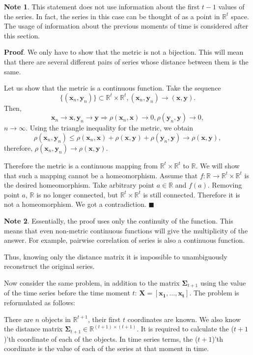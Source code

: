 \documentclass{article}
\begin{document}
\textbf{Note 1}. This statement does not use information about the first $t-1$ values of the series. In fact, the series in this case can be thought of as a point in $\mathbb{R}^t$ space. The usage of information about the previous moments of time is considered after this section.

\textbf{Proof}. We only have to show that the metric is not a bijection. This will mean that there are several different pairs of series whose distance between them is the same.

Let us show that the metric is a continuous function. Take the sequence \[\{(\mathbf{x}_n, \mathbf{y}_n)\} \subset \mathbb{R}^t \times \mathbb{R}^t, (\mathbf{x}_n, \mathbf{y}_n) \to (\mathbf{x}, \mathbf{y}).\] Then, \[\mathbf{x}_n\to \mathbf{x}, \mathbf{y}_n\to \mathbf{y} \Rightarrow \rho(\mathbf{x}_n,\mathbf{x})\to 0 ,\rho(\mathbf{y}_n,\mathbf{y})\to 0,\] $n \to \infty.$ Using the triangle inequality for the metric, we obtain \[\rho(\mathbf{x}_n,\mathbf{y}_n)\leqslant \rho(\mathbf{x}_n,\mathbf{x})+\rho(\mathbf{x},\mathbf{y})+\rho(\mathbf{y}_n,\mathbf{y})\to \rho(\mathbf{x},\mathbf{y}),\] therefore, $\rho(\mathbf{x}_n,\mathbf{y}_n)\to \rho(\mathbf{x},\mathbf{y})$.

Therefore the metric is a continuous mapping from $\mathbb{R}^t \times \mathbb{R}^t$ to $\mathbb{R}$. We will show that such a mapping cannot be a homeomorphism. Assume that $f: \mathbb{R} \to \mathbb{R}^t \times \mathbb{R}^t$ is the desired homeomorphism. Take arbitrary point $a \in \mathbb{R}$ and $f(a)$. Removing point $a$, $\mathbb{R}$ is no longer connected, but $\mathbb{R}^t \times \mathbb{R}^t$ is still connected. Therefore it is not a homeomorphism. We got a contradiction.
$\blacksquare$

\textbf{Note 2}. Essentially, the proof uses only the continuity of the function. This means that even non-metric continuous functions will give the multiplicity of the answer. For example, pairwise correlation of series is also a continuous function.

Thus, knowing only the distance matrix it is impossible to unambiguously reconstruct the original series.

Now consider the same problem, in addition to the matrix $\mathbf{\Sigma}_{t+1}$ using the value of the time series before the time moment $t$: $\mathbf{X}=[\mathbf{x_1}, \ldots, \mathbf{x_{t}}]$. The problem is reformulated as follows:

There are $n$ objects in $\mathbb{R}^{t+1}$, their first $t$ coordinates are known. We also know the distance matrix $\mathbf{\Sigma}_{t+1} \in \mathbb{R}^{(t+1) \times (t+1)}$. It is required to calculate the ($t+1$)'th coordinate of each of the objects. In time series terms, the ($t+1$)'th coordinate is the value of each of the series at that moment in time.
\end{document}
